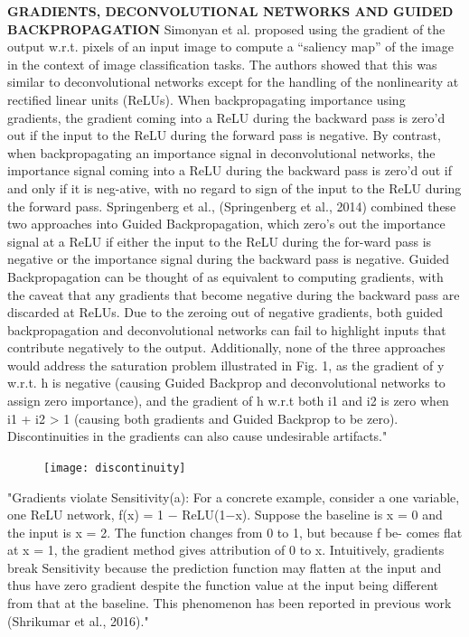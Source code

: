		\textbf{GRADIENTS, DECONVOLUTIONAL NETWORKS AND GUIDED BACKPROPAGATION}
		Simonyan et al. \cite{Simonyan2014} proposed using the gradient of the output w.r.t. pixels of an input image to compute a “saliency map” of the image in the context of image classification tasks. The authors showed that this was similar to deconvolutional networks \cite{Zeiler2014} except for the handling of the nonlinearity at rectified linear units (ReLUs). When backpropagating importance using gradients, the gradient coming into a ReLU during the backward pass is zero’d out if the input to the ReLU during the forward pass is negative. By contrast, when backpropagating an importance signal in deconvolutional networks, the importance signal coming into a ReLU during the backward pass is zero’d out if and only if it is neg-ative, with no regard to sign of the input to the ReLU during the forward pass.
		Springenberg et al., (Springenberg et al., 2014) combined these two approaches into Guided Backpropagation, which zero’s out the importance signal at a ReLU if either the input to the ReLU during the for-ward pass is negative or the importance signal during the backward pass is negative. Guided Backpropagation can be thought of as equivalent to computing gradients, with the caveat that any gradients that become negative during the backward pass are discarded at ReLUs. Due to the zeroing out of negative gradients, both guided backpropagation and deconvolutional networks can fail to highlight inputs that contribute negatively to the output. Additionally, none of the three approaches would address the saturation problem illustrated in Fig. 1, as the gradient of y w.r.t. h is negative (causing Guided Backprop and deconvolutional networks to assign zero importance), and the gradient of h w.r.t both i1 and i2 is zero when i1 + i2 > 1 (causing both gradients and Guided Backprop to be zero). Discontinuities in the gradients can also cause undesirable artifacts." \cite{Shrikumar2017}
		\begin{figure}[h]
			\centering
			\texttt{[image: discontinuity]}
		\end{figure}
		
		"Gradients violate Sensitivity(a): For a concrete example, consider a one variable, one ReLU network, f(x) = 1 − ReLU(1−x). Suppose the baseline is x = 0 and the input is x = 2. The function changes from 0 to 1, but because f be- comes flat at x = 1, the gradient method gives attribution of 0 to x. Intuitively, gradients break Sensitivity because the prediction function may flatten at the input and thus have zero gradient despite the function value at the input being different from that at the baseline. This phenomenon has been reported in previous work (Shrikumar et al., 2016)." \cite{Sundararajan2017}
		

